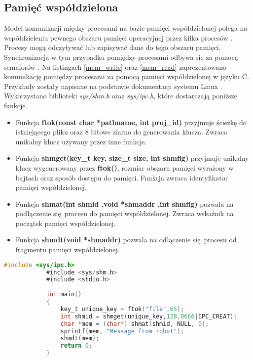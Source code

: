 {    \subsection{Pamięć współdzielona}
    {
        Model komunikacji między procesami na bazie pamięci współdzielonej polega na współdzieleniu pewnego obszaru pamięci operacyjnej przez kilka procesów \cite{com_distr}. Procesy mogą odczytywać lub zapisywać dane do tego obszaru pamięci. Synchronizacja w tym przypadku pomiędzy procesami odbywa się za pomocą semaforów \cite{com_distr}. Na listingach \ref{mem_write} oraz \ref{mem_read} zaprezentowano komunikację pomiędzy procesami za pomocą pamięci współdzielonej w języku C. Przykłady zostały napisane na podstawie dokumentacji systemu Linux \cite{sh_docs}. Wykorzystano biblioteki \textit{sys/shm.h} oraz \textit{sys/ipc.h}, które dostarczają poniższe funkcje. 
        \begin{itemize}
            \item Funkcja \textbf{ftok(const char *pathname, int proj\_id)} przyjmuje ścieżkę do istniejącego pliku oraz 8 bitowe ziarno do generowania klucza. Zwraca unikalny klucz używany przez inne funkcje. 
            \item Funkcja \textbf{shmget(key\_t key, size\_t size, int shmflg)} przyjmuje unikalny klucz wygenerowany przez \textbf{ftok()}, rozmiar obszaru pamięci wyrażony w bajtach oraz sposób dostępu do pamięci. Funkcja zwraca identyfikator pamięci współdzielonej.
            \item Funkcja \textbf{shmat(int shmid ,void *shmaddr ,int shmflg)} pozwala na podłączenie się procesu do pamięci współdzielonej. Zwraca wskaźnik na początek pamięci współdzielonej.
            \item Funkcja \textbf{shmdt(void *shmaddr)} pozwala na odłączenie się procesu od fragmentu pamięci współdzielonej.
        \end{itemize}

        \vspace{3mm}

        \begin{lstlisting}[caption=Przykładowa implementacja procesu zapisującego dane do pamięci \\ współdzielonej~w~języku~C, language=C, label=mem_write]
            #include <sys/ipc.h>
            #include <sys/shm.h>
            #include <stdio.h>
            
            int main()
            {
            	key_t unique_key = ftok("file",65);
            	int shmid = shmget(unique_key,128,0666|IPC_CREAT);
            	char *mem = (char*) shmat(shmid, NULL, 0);
            	sprintf(mem, "Message from robot");
            	shmdt(mem);
            	return 0;
            }
        \end{lstlisting}

}}
